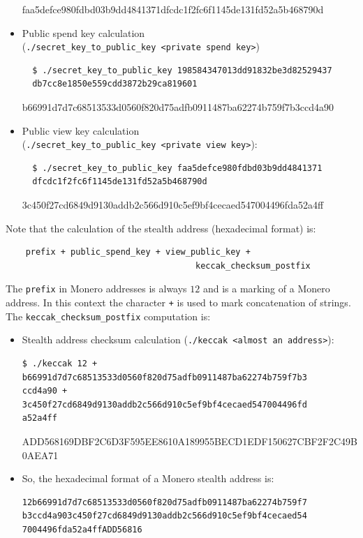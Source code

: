 \begin{itemize}
\begin{tcolorbox}[colback=blue!5!white,colframe=blue!65!black,title=Output:]
    \tcblower
    \small{faa5defce980fdbd03b9dd4841371dfcdc1f2fc6f1145de131fd52a5b468790d}
  \end{tcolorbox}
  \item Public spend key calculation\\
  (\verb|./secret_key_to_public_key <private spend key>|)
  \begin{verbatim}
  $ ./secret_key_to_public_key 198584347013dd91832be3d82529437
  db7cc8e1850e559cdd3872b29ca819601
  \end{verbatim}
  \begin{tcolorbox}[colback=blue!5!white,colframe=blue!65!black,title=Output:]
    \small{b66991d7d7c68513533d0560f820d75adfb0911487ba62274b759f7b3ccd4a90}
  \end{tcolorbox}
  \item Public view key calculation\\
  (\verb|./secret_key_to_public_key <private view key>|):
  \begin{verbatim}
  $ ./secret_key_to_public_key faa5defce980fdbd03b9dd4841371
  dfcdc1f2fc6f1145de131fd52a5b468790d
  \end{verbatim}
  \begin{tcolorbox}[colback=blue!5!white,colframe=blue!65!black,title=Output:]
    \small{3c450f27cd6849d9130addb2c566d910c5ef9bf4cecaed547004496fda52a4ff}
  \end{tcolorbox}
\end{itemize}

Note that the calculation of the stealth address (hexadecimal format) is:
\begin{verbatim}
    prefix + public_spend_key + view_public_key +
                                      keccak_checksum_postfix
\end{verbatim}
\clearpage
\pagebreak

The \verb|prefix| in Monero addresses is always $12$ and is a marking of a Monero address. In this context the character \verb|+| is used to mark concatenation of strings. The \verb|keccak_checksum_postfix| computation is:
\begin{itemize}
  \item Stealth address checksum calculation (\verb|./keccak <almost an address>|):
  \begin{verbatim}
$ ./keccak 12 +
b66991d7d7c68513533d0560f820d75adfb0911487ba62274b759f7b3
ccd4a90 +
3c450f27cd6849d9130addb2c566d910c5ef9bf4cecaed547004496fd
a52a4ff
  \end{verbatim}
  \begin{tcolorbox}[colback=blue!5!white,colframe=blue!65!black,title=Output:]
    \footnotesize{ADD568169DBF2C6D3F595EE8610A189955BECD1EDF150627CBF2F2C49B0AEA71}
  \end{tcolorbox}
  \item So, the hexadecimal format of a Monero stealth address is:
  \begin{verbatim}
12b66991d7d7c68513533d0560f820d75adfb0911487ba62274b759f7
b3ccd4a903c450f27cd6849d9130addb2c566d910c5ef9bf4cecaed54
7004496fda52a4ffADD56816
  \end{verbatim}
\end{itemize}

